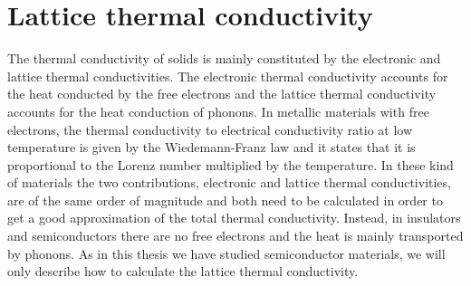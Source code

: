 
\chapter{Lattice thermal conductivity} %

\label{Chapter4} %


The thermal conductivity of solids is mainly constituted by the electronic and lattice thermal conductivities\cite{tritt2005thermal}. The electronic thermal conductivity accounts for the heat conducted by the free 
electrons and the lattice thermal conductivity accounts for the heat conduction of phonons. In metallic materials with free electrons, the thermal conductivity to electrical conductivity ratio at low temperature is given by the 
Wiedemann-Franz law and it states that it is proportional to the Lorenz number multiplied by the temperature\cite{ashcroft1976solid}. In these kind of materials the two contributions, electronic and lattice thermal conductivities, are 
of the same order of magnitude and both need to be calculated in order to get a good approximation of the total thermal conductivity. Instead, in insulators and semiconductors there are no free electrons and the 
heat is mainly transported by phonons. As in this thesis we have studied semiconductor materials, we will only describe how to calculate the lattice thermal conductivity. \\
 
